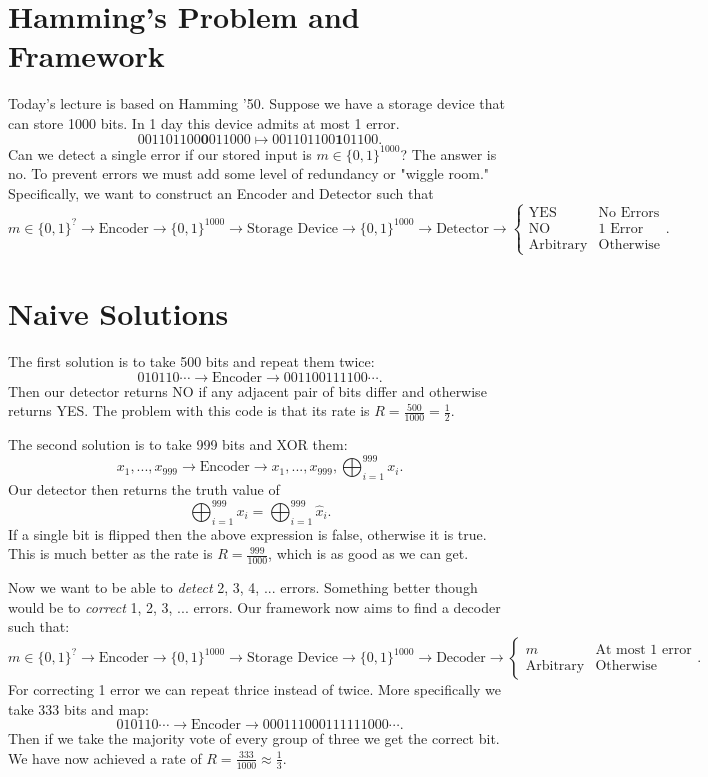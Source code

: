 \documentclass[10pt]{article}
\begin{document}
\section{Hamming's Problem and Framework}
Today's lecture is based on Hamming '50. Suppose we have a storage device that can store 1000 bits. In 1 day this device admits at most 1 error. 
$$
001101100\mathbf{0}011000 \mapsto 001101100\mathbf{1}01100
.$$
Can we detect a single error if our stored input is $m \in \{0, 1\}^{1000}$? The answer is no. To prevent errors we must add some level of redundancy or "wiggle room." Specifically, we want to construct an Encoder and Detector such that
$$
m \in \{0, 1\}^{?} \rightarrow \text{Encoder} \rightarrow \{0, 1\}^{1000} \rightarrow \text{Storage Device} \rightarrow \{0, 1\}^{1000} \rightarrow \text{Detector} \rightarrow \begin{cases}
\text{YES} & \text{No Errors} \\
\text{NO} & \text{1 Error} \\
\text{Arbitrary} & \text{Otherwise}
\end{cases}
.$$

\section{Naive Solutions}

The first solution is to take 500 bits and repeat them twice: $$010110 \cdots \rightarrow \text{Encoder} \rightarrow 001100111100\cdots.$$ Then our detector returns NO if any adjacent pair of bits differ and otherwise returns YES. The problem with this code is that its rate is $R = \frac{500}{1000} = \frac{1}{2}.$

The second solution is to take 999 bits and XOR them:
$$
x_1, ..., x_{999} \rightarrow \text{Encoder} \rightarrow x_1, ..., x_{999}, \bigoplus_{i=1}^{999}x_i
.$$
Our detector then returns the truth value of $$\bigoplus_{i=1}^{999}x_i = \bigoplus_{i=1}^{999}\hat{x}_i.$$ If a single bit is flipped then the above expression is false, otherwise it is true. This is much better as the rate is $R = \frac{999}{1000}$, which is as good as we can get.

Now we want to be able to \emph{detect} 2, 3, 4, ... errors. Something better though would be to \emph{correct} 1, 2, 3, ... errors. Our framework now aims to find a decoder such that:
$$
m \in \{0, 1\}^{?} \rightarrow \text{Encoder} \rightarrow \{0, 1\}^{1000} \rightarrow \text{Storage Device} \rightarrow \{0, 1\}^{1000} \rightarrow \text{Decoder} \rightarrow \begin{cases}
m & \text{At most 1 error} \\
\text{Arbitrary} & \text{Otherwise}
\end{cases}
.$$
 For correcting 1 error we can repeat thrice instead of twice. More specifically we take 333 bits and map:
$$
010110\cdots \rightarrow \text{Encoder} \rightarrow 000111000111111000\cdots
.$$ Then if we take the majority vote of every group of three we get the correct bit. We have now achieved a rate of $R = \frac{333}{1000} \approx \frac{1}{3}.$
\end{document}
